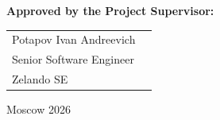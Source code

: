 \begin{titlepage}
\vspace{1em}
{\bf Approved by the Project Supervisor: \vspace{2mm}}

{
\begin{tabular}{l@{\hskip 1.5cm}l}
Potapov Ivan Andreevich\\
Senior Software Engineer\\
Zelando SE
\end{tabular}}





\vspace{\fill}

\begin{center}
Moscow 2026
\end{center}

\end{titlepage}